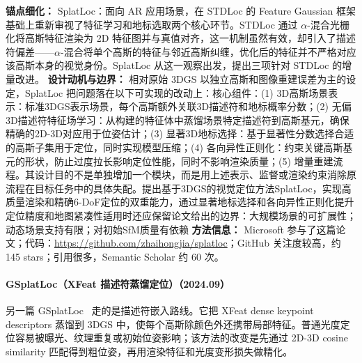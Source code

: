 \textbf{锚点细化：} SplatLoc：面向 AR 应用场景，在 STDLoc 的 Feature Gaussian 框架基础上重新审视了特征学习和地标选取两个核心环节。STDLoc 通过 $\alpha$-混合光栅化将高斯特征渲染为 2D 特征图并与真值对齐，这一机制虽然有效，却引入了描述符偏差——$\alpha$-混合将单个高斯的特征与邻近高斯纠缠，优化后的特征并不严格对应该高斯本身的视觉身份。SplatLoc 从这一观察出发，提出三项针对 STDLoc 的增量改进。
\textbf{设计动机与边界：} 相对原始 3DGS 以独立高斯和图像重建误差为主的设定，SplatLoc 把问题落在以下可实现的改动上：核心组件：(1) 3D高斯场景表示：标准3DGS表示场景，每个高斯额外关联3D描述符和地标概率分数；(2) 无偏3D描述符特征场学习：从构建的特征体中蒸馏场景特定描述符到高斯基元，确保精确的2D-3D对应用于位姿估计；(3) 显著3D地标选择：基于显著性分数选择合适的高斯子集用于定位，同时实现模型压缩；(4) 各向异性正则化：约束关键高斯基元的形状，防止过度拉长影响定位性能，同时不影响渲染质量；(5) 增量重建流程。其设计目的不是单独增加一个模块，而是用上述表示、监督或渲染约束消除原流程在目标任务中的具体失配。提出基于3DGS的视觉定位方法SplatLoc，实现高质量渲染和精确6-DoF定位的双重能力，通过显著地标选择和各向异性正则化提升定位精度和地图紧凑性适用时还应保留论文给出的边界：大规模场景的可扩展性；动态场景支持有限；对初始SfM质量有依赖
\textbf{方法信息：} Microsoft 参与了这篇论文；代码：\url{https://github.com/zhaihongjia/splatloc}；GitHub 关注度较高，约 145 stars；引用很多，Semantic Scholar 约 60 次。



\paragraph{GSplatLoc（XFeat 描述符蒸馏定位）（2024.09）}
另一篇 GSplatLoc~\cite{2409_16502} 走的是描述符嵌入路线。它把 XFeat dense keypoint descriptors 蒸馏到 3DGS 中，使每个高斯除颜色外还携带局部特征。普通光度定位容易被曝光、纹理重复或初始位姿影响；该方法的改变是先通过 2D-3D cosine similarity 匹配得到粗位姿，再用渲染特征和光度变形损失做精化。

